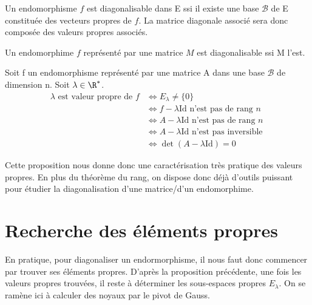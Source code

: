 \begin{proposition}
    Un endomorphisme $f$ est diagonalisable dans E ssi il existe une base $\mathcal{B}$ de E 
    constituée des vecteurs propres de $f$. 
    La matrice diagonale associé sera donc composée des valeurs propres associés. 
\end{proposition}

\begin{proposition}
    Un endomorphime $f$ représenté par une matrice $M$ est diagonalisable ssi M l'est. 
\end{proposition}


\begin{proposition}
    Soit f un endomorphisme représenté par une matrice A dans une base $\mathcal{B}$ de dimension n. 
    Soit $ \lambda \in \R^*$. 
    \begin{align*}
        \lambda \text{ est valeur propre de } f & \iff E_\lambda \not = \{ 0 \} \\ 
                                                & \iff f - \lambda \text{Id} \text{ n'est pas de rang } n \\ 
                                                & \iff A - \lambda \text{Id} \text{ n'est pas de rang } n \\ 
                                                & \iff A - \lambda \text{Id} \text{ n'est pas inversible } \\ 
                                                & \iff \det (A - \lambda \text{Id}) = 0 
    \end{align*}
\end{proposition}

Cette proposition nous donne donc une caractérisation très pratique des valeurs propres. 
En plus du théorème du rang, on dispose donc déjà d'outils puissant pour étudier la diagonalisation d'une matrice/d'un endomorphime. 


\section{Recherche des éléments propres}

En pratique, pour diagonaliser un endormorphisme, il nous faut donc commencer par trouver ses éléments propres. 
D'après la proposition précédente, une fois les valeurs propres trouvées, il reste à déterminer les sous-espaces propres $E_\lambda$.
On se ramène ici à calculer des noyaux par le pivot de Gauss. 

